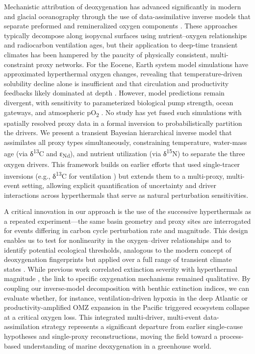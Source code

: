 \documentclass{article}
\begin{document}
Mechanistic attribution of deoxygenation has advanced significantly in modern and glacial oceanography through the use of data-assimilative inverse models that separate preformed and remineralized oxygen components \cite{bopp2002globalbiogeochemcyc, schmittner2013paleoceanography, deutsch2005nature}. These approaches typically decompose along isopycnal surfaces using nutrient–oxygen relationships and radiocarbon ventilation ages, but their application to deep-time transient climates has been hampered by the paucity of physically consistent, multi-constraint proxy networks. For the Eocene, Earth system model simulations have approximated hyperthermal oxygen changes, revealing that temperature-driven solubility decline alone is insufficient and that circulation and productivity feedbacks likely dominated at depth \cite{wilson2018rapid, norris2013paleoceanography}. However, model predictions remain divergent, with sensitivity to parameterized biological pump strength, ocean gateways, and atmospheric pO\textsubscript{2} \cite{kirtland2012eocene}. No study has yet fused such simulations with spatially resolved proxy data in a formal inversion to probabilistically partition the drivers. We present a transient Bayesian hierarchical inverse model that assimilates all proxy types simultaneously, constraining temperature, water-mass age (via δ\textsuperscript{13}C and ε\textsubscript{Nd}), and nutrient utilization (via δ\textsuperscript{15}N) to separate the three oxygen drivers. This framework builds on earlier efforts that used single-tracer inversions (e.g., δ\textsuperscript{13}C for ventilation \cite{thomas2002geology}) but extends them to a multi-proxy, multi-event setting, allowing explicit quantification of uncertainty and driver interactions across hyperthermals that serve as natural perturbation sensitivities.

A critical innovation in our approach is the use of the successive hyperthermals as a repeated experiment—the same basin geometry and proxy sites are interrogated for events differing in carbon cycle perturbation rate and magnitude. This design enables us to test for nonlinearity in the oxygen–driver relationships and to identify potential ecological thresholds, analogous to the modern concept of deoxygenation fingerprints but applied over a full range of transient climate states \cite{payne2016science}. While previous work correlated extinction severity with hyperthermal magnitude \cite{sexton2011nature, thomas2002geology}, the link to specific oxygenation mechanisms remained qualitative. By coupling our inverse-model decomposition with benthic extinction indices, we can evaluate whether, for instance, ventilation-driven hypoxia in the deep Atlantic or productivity-amplified OMZ expansion in the Pacific triggered ecosystem collapse at a critical oxygen loss. This integrated multi-driver, multi-event data-assimilation strategy represents a significant departure from earlier single-cause hypotheses and single-proxy reconstructions, moving the field toward a process-based understanding of marine deoxygenation in a greenhouse world.
\end{document}
